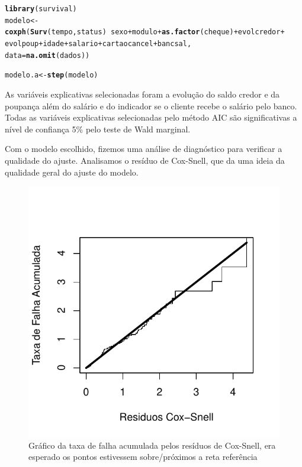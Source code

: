 \documentclass{article}\usepackage[]{graphicx}\usepackage[]{color}
\makeatletter
\def\maxwidth{ %
  \ifdim\Gin@nat@width>\linewidth
    \linewidth
  \else
    \Gin@nat@width
  \fi
}
\newcommand{\hlopt}[1]{\textcolor[rgb]{0,0,0}{#1}}%
\newcommand{\hlstd}[1]{\textcolor[rgb]{0.345,0.345,0.345}{#1}}%
\newcommand{\hlkwb}[1]{\textcolor[rgb]{0.69,0.353,0.396}{#1}}%
\newcommand{\hlkwc}[1]{\textcolor[rgb]{0.333,0.667,0.333}{#1}}%
\newcommand{\hlkwd}[1]{\textcolor[rgb]{0.737,0.353,0.396}{\textbf{#1}}}%
\newenvironment{kframe}{%
 \def\at@end@of@kframe{}%
 \ifinner\ifhmode%
  \def\at@end@of@kframe{\end{minipage}}%
  \begin{minipage}{\columnwidth}%
 \fi\fi%
 \def\FrameCommand##1{\hskip\@totalleftmargin \hskip-\fboxsep
 \colorbox{shadecolor}{##1}\hskip-\fboxsep
     \hskip-\linewidth \hskip-\@totalleftmargin \hskip\columnwidth}%
 \MakeFramed {\advance\hsize-\width
   \@totalleftmargin\z@ \linewidth\hsize
   \@setminipage}}%
 {\par\unskip\endMakeFramed%
 \at@end@of@kframe}
\newenvironment{knitrout}{}{} %
\makeatother
\begin{document}
\begin{knitrout}
\color{fgcolor}\begin{kframe}
\begin{alltt}
\hlkwd{library}\hlstd{(survival)}
\hlstd{modelo} \hlkwb{<-} \hlkwd{coxph}\hlstd{(}\hlkwd{Surv}\hlstd{(tempo,status)} \hlopt{~} \hlstd{sexo} \hlopt{+} \hlstd{modulo} \hlopt{+} \hlkwd{as.factor}\hlstd{(cheque)} \hlopt{+} \hlstd{evolcredor} \hlopt{+}
                   \hlstd{evolpoup} \hlopt{+} \hlstd{idade} \hlopt{+} \hlstd{salario} \hlopt{+} \hlstd{cartaocancel} \hlopt{+} \hlstd{bancsal,}
                \hlkwc{data} \hlstd{=} \hlkwd{na.omit}\hlstd{(dados))}


\hlstd{modelo.a} \hlkwb{<-} \hlkwd{step}\hlstd{(modelo)}
\end{alltt}
\end{kframe}
\end{knitrout}

As variáveis explicativas selecionadas foram a evolução do saldo credor e da poupança além do salário e do indicador se o cliente recebe o salário pelo banco.
Todas as variáveis explicativas selecionadas pelo método AIC são significativas a nível de confiança 5\% pelo teste de Wald marginal.

Com o modelo escolhido, fizemos uma análise de diagnóstico para verificar a qualidade do ajuste. Analisamos o resíduo de Cox-Snell, que da uma ideia da qualidade geral do ajuste do modelo.

\begin{figure}[t!]
\centering
\begin{knitrout}
\color{fgcolor}
\includegraphics[width=\maxwidth]{figure/unnamed-chunk-8} 

\end{knitrout}
\caption{Gráfico da taxa de falha acumulada pelos resíduos de Cox-Snell, era esperado os pontos estivessem sobre/próximos a reta referência}
\end{figure}
\end{document}
